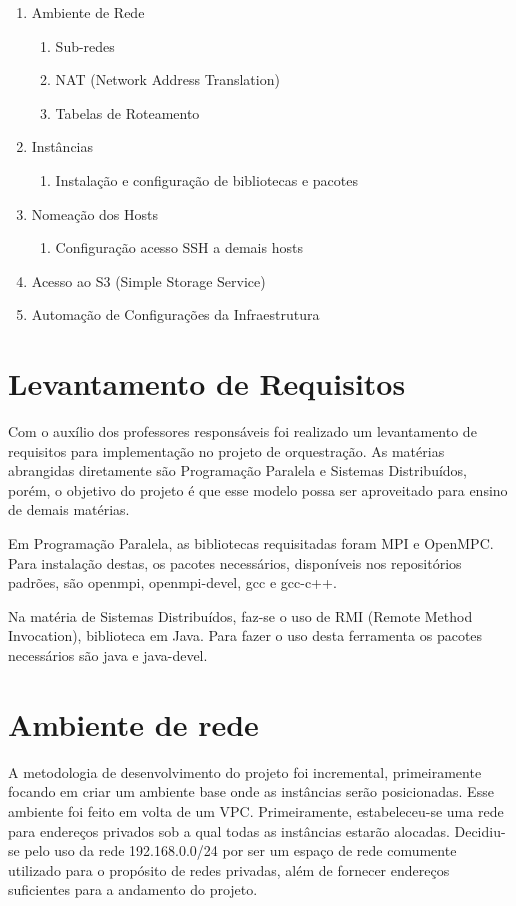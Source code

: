 \documentclass[tg]{mdtufsm}
\begin{document}
\begin{enumerate}
	\item Ambiente de Rede
	\begin{enumerate}
		\item Sub-redes
		\item NAT (Network Address Translation)
		\item Tabelas de Roteamento
	\end{enumerate}
	\item Instâncias
	\begin{enumerate}
		\item Instalação e configuração de bibliotecas e pacotes
	\end{enumerate}
	\item Nomeação dos Hosts
	\begin{enumerate}
		\item Configuração acesso SSH a demais hosts
	\end{enumerate}
	\item Acesso ao S3 (Simple Storage Service)
	\item Automação de Configurações da Infraestrutura
\end{enumerate}


\section{Levantamento de Requisitos}

Com o auxílio dos professores responsáveis foi realizado um levantamento de requisitos para implementação no projeto de orquestração. As matérias abrangidas diretamente são Programação Paralela e Sistemas Distribuídos, porém, o objetivo do projeto é que esse modelo possa ser aproveitado para ensino de demais matérias.

Em Programação Paralela, as bibliotecas requisitadas foram MPI e OpenMPC. Para instalação destas, os pacotes necessários, disponíveis nos repositórios padrões, são openmpi, openmpi-devel, gcc e gcc-c++.

Na matéria de Sistemas Distribuídos, faz-se o uso de RMI (Remote Method Invocation), biblioteca em Java. Para fazer o uso desta ferramenta os pacotes necessários são java e java-devel.

\section{Ambiente de rede}

A metodologia de desenvolvimento do projeto foi incremental, primeiramente focando em criar um ambiente base onde as instâncias serão posicionadas. Esse ambiente foi feito em volta de um VPC. Primeiramente, estabeleceu-se uma rede para endereços privados sob a qual todas as instâncias estarão alocadas. Decidiu-se pelo uso da rede 192.168.0.0/24 por ser um espaço de rede comumente utilizado para o propósito de redes privadas, além de fornecer endereços suficientes para a andamento do projeto.
\end{document}
